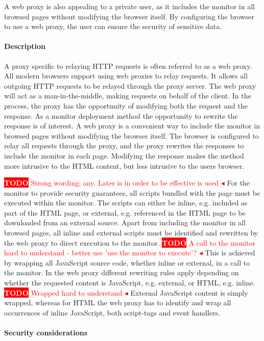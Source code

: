 \documentclass{llncs}
\newcommand{\todo}[1]{\colorbox{red}{\textcolor{white}{\sffamily\bfseries\scriptsize TODO}} \textcolor{red}{#1} \textcolor{red}{$\blacktriangleleft$}}
\begin{document}
A web proxy is also appealing to a private user, as it includes the monitor in all browsed pages without modifying 
the browser itself. By configuring the browser to use a web proxy, the user can ensure the security 
of sensitive data.

\paragraph{Description}
A proxy specific to relaying HTTP requests is often referred to as a web proxy.
All modern browsers support using web proxies to relay requests.
It allows all outgoing HTTP requests to be 
relayed through the proxy server. The web proxy will act as a man-in-the-middle, making 
requests on behalf of the client. In the process, the proxy has the 
opportunity of modifying both the request and the response. 
As a monitor deployment method the opportunity to rewrite the response is 
of interest. A web proxy is a convenient way to include the monitor in browsed pages without 
modifying the browser itself. The browser is configured to relay 
all requests through the proxy, and the proxy rewrites the responses to include 
the monitor in each page. Modifying the response makes the method more 
intrusive to the HTML content, but less intrusive to the users browser. 

\todo{Strong wording; any. Later is in order to be effective is used}
For the monitor to provide security guarantees, all scripts bundled with 
the page must be executed within the monitor. The scripts can either be inline, 
e.g. included as part of the HTML page, or external, e.g. referenced in the 
HTML page to be downloaded from an external source.
Apart from including the monitor in all browsed pages, all inline and external 
scripts must be identified and rewritten by the web proxy to direct execution to the monitor.
\todo{A call to the monitor hard to understand - better use 'use the monitor to execute'?}
This is achieved by wrapping all JavaScript source code, whether inline or external, in a call to the monitor.
In the web proxy different rewriting rules apply depending on whether the 
requested content is JavaScript, e.g. external, or HTML, e.g. inline. 
\todo{Wrapped hard to understand}
External 
JavaScript content is simply wrapped, whereas 
for HTML the web proxy has to identify and wrap all occurrences of inline 
JavaScript, both script-tags and event handlers.


\paragraph{Security considerations}
\end{document}
